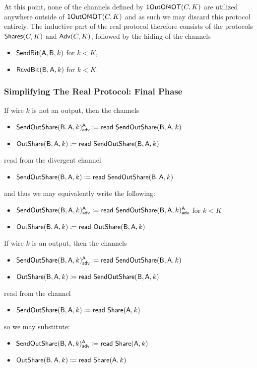 \noindent At this point, none of the channels defined by $\mathsf{1OutOf4OT}(C,K)$ are utilized anywhere outside of $\mathsf{1OutOf4OT}(C,K)$ and as such we may discard this protocol entirely. The inductive part of the real protocol therefore consists of the protocols $\mathsf{Shares}(C,K)$ and $\mathsf{Adv}(C,K)$, followed by the hiding of the channels
\begin{itemize}
\item $\mathsf{SendBit}(\mathsf{A},\mathsf{B},k)$ for $k < K$,
\item $\mathsf{RcvdBit}(\mathsf{B},\mathsf{A},k)$ for $k < K$.
\end{itemize}

\subsubsection{Simplifying The Real Protocol: Final Phase}
If wire $k$ is not an output, then the channels
\begin{itemize}
\item {\color{blue} $\mathsf{SendOutShare}(\mathsf{B},\mathsf{A},k)^{\mathsf{A}}_{\mathsf{adv}} \coloneqq \mathsf{read} \ \mathsf{SendOutShare}(\mathsf{B},\mathsf{A},k)$}
\item $\mathsf{OutShare}(\mathsf{B},\mathsf{A},k) \coloneqq \mathsf{read} \ \mathsf{SendOutShare}(\mathsf{B},\mathsf{A},k)$
\end{itemize}
read from the divergent channel
\begin{itemize}
\item $\mathsf{SendOutShare}(\mathsf{B},\mathsf{A},k) \coloneqq \mathsf{read} \ \mathsf{SendOutShare}(\mathsf{B},\mathsf{A},k)$
\end{itemize}
and thus we may equivalently write the following:
\begin{itemize}
\item {\color{blue} $\mathsf{SendOutShare}(\mathsf{B},\mathsf{A},k)^{\mathsf{A}}_{\mathsf{adv}} \coloneqq \mathsf{read} \ \mathsf{SendOutShare}(\mathsf{B},\mathsf{A},k)^{\mathsf{A}}_{\mathsf{adv}}$ for $k < K$}
\item $\mathsf{OutShare}(\mathsf{B},\mathsf{A},k) \coloneqq \mathsf{read} \ \mathsf{OutShare}(\mathsf{B},\mathsf{A},k)$
\end{itemize}
If wire $k$ is an output, then the channels
\begin{itemize}
\item {\color{blue} $\mathsf{SendOutShare}(\mathsf{B},\mathsf{A},k)^{\mathsf{A}}_{\mathsf{adv}} \coloneqq \mathsf{read} \ \mathsf{SendOutShare}(\mathsf{B},\mathsf{A},k)$}
\item $\mathsf{OutShare}(\mathsf{B},\mathsf{A},k) \coloneqq \mathsf{read} \ \mathsf{SendOutShare}(\mathsf{B},\mathsf{A},k)$
\end{itemize}
read from the channel
\begin{itemize}
\item $\mathsf{SendOutShare}(\mathsf{B},\mathsf{A},k) \coloneqq \mathsf{read} \ \mathsf{Share}(\mathsf{A},k)$
\end{itemize}
so we may substitute:
\begin{itemize}
\item {\color{blue} $\mathsf{SendOutShare}(\mathsf{B},\mathsf{A},k)^{\mathsf{A}}_{\mathsf{adv}} \coloneqq \mathsf{read} \ \mathsf{Share}(\mathsf{A},k)$}
\item $\mathsf{OutShare}(\mathsf{B},\mathsf{A},k) \coloneqq \mathsf{read} \ \mathsf{Share}(\mathsf{A},k)$
\end{itemize}
